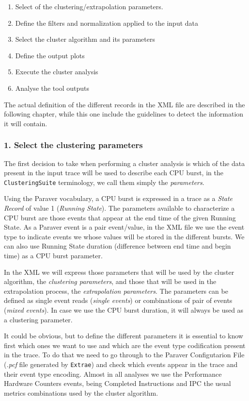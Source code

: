 \documentclass[twoside,a4,english,11pt]{book}
\begin{document}
\begin{enumerate}
  \item Select of the clustering/extrapolation parameters.
  \item Define the filters and normalization applied to the input data
  \item Select the cluster algorithm and its parameters
  \item Define the output plots
  \item Execute the cluster analysis
  \item Analyse the tool outputs
\end{enumerate}

The actual definition of the different records in the XML file are described
in the following chapter, while this one include the guidelines to detect the 
information it will contain.

\subsubsection*{1. Select the clustering parameters}

The first decision to take when performing a cluster analysis is which
of the data present in the input trace will be used to describe each
CPU burst, in the \texttt{ClusteringSuite} terminology, we call them simply
the \textit{parameters}.

Using the Paraver vocabulary, a CPU burst is expressed in a trace
as a \textit{State Record} of value 1 (\textit{Running State}). The
parameters available to characterize a CPU burst are those events that appear
at the end time of the given Running State. As a Paraver event is a pair 
event/value, in the XML file we use the event type to indicate events we 
whose values will be stored in the different bursts. We can also use
Running State duration (difference between end time and begin time) as 
a CPU burst parameter.

In the XML we will express those parameters that will be used by the cluster
algorithm, the \textit{clustering parameters}, and those that will be used
in the extrapolation process, the \textit{extrapolation parameters}. The
parameters can be defined as single event reads (\textit{single events}) 
or combinations of pair of events (\textit{mixed events}). In case we use
the CPU burst duration, it will always be used as a clustering parameter.

It could be obvious, but to define the different parameters it is essential
to know first which ones we want to use and which are the event type
codification present in the trace. To do that we need to go through to the 
Paraver Configutarion File (\textit{.pcf} file generated by \texttt{Extrae}) 
and check which events appear in the trace and their event type encoding.
Almost in all analyses we use the Performance Hardware Counters events,
being Completed Instructions and IPC the usual metrics combinations used by
the cluster algorithm.
\end{document}
